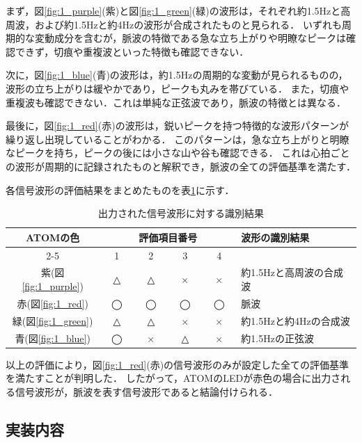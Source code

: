 まず，図\ref{fig:1_purple}(紫)と図\ref{fig:1_green}(緑)の波形は，それぞれ約1.5Hzと高周波，および約1.5Hzと約4Hzの波形が合成されたものと見られる．
いずれも周期的な変動成分を含むが，脈波の特徴である急な立ち上がりや明瞭なピークは確認できず，切痕や重複波といった特徴も確認できない．

次に，図\ref{fig:1_blue}(青)の波形は，約1.5Hzの周期的な変動が見られるものの，波形の立ち上がりは緩やかであり，ピークも丸みを帯びている．
また，切痕や重複波も確認できない．これは単純な正弦波であり，脈波の特徴とは異なる．

最後に，図\ref{fig:1_red}(赤)の波形は，鋭いピークを持つ特徴的な波形パターンが繰り返し出現していることがわかる．
このパターンは，急な立ち上がりと明瞭なピークを持ち，ピークの後には小さな山や谷も確認できる．
これは心拍ごとの波形が周期的に記録されたものと解釈でき，脈波の全ての評価基準を満たす．

各信号波形の評価結果をまとめたものを表\ref{tab:1-2}に示す．
\begin{table}[H]
  \caption{出力された信号波形に対する識別結果}
  \centering
  \begin{tabular}{|c|c|c|c|c|l|}
    \hline
    \multirow{2}{*}{ATOMの色} & \multicolumn{4}{c|}{評価項目番号} & \multirow{2}{*}{波形の識別結果} \\
    \cline{2-5}
     & ~~1~~ & ~~2~~ & ~~3~~ & ~~4~~ & \\
    \hline \hline
    紫(図\ref{fig:1_purple}) & △ & △ & × & × & 約1.5Hzと高周波の合成波 \\
    \hline
    赤(図\ref{fig:1_red}) & ◯ & ◯ & ◯ & ◯ & 脈波 \\
    \hline
    緑(図\ref{fig:1_green}) & △ & △ & × & × & 約1.5Hzと約4Hzの合成波 \\
    \hline
    青(図\ref{fig:1_blue}) & ◯ & × & △ & × & 約1.5Hzの正弦波 \\
    \hline
  \end{tabular}
  \label{tab:1-2}
\end{table}

以上の評価により，図\ref{fig:1_red}(赤)の信号波形のみが設定した全ての評価基準を満たすことが判明した．
したがって，ATOMのLEDが赤色の場合に出力される信号波形が，脈波を表す信号波形であると結論付けられる．


\newpage

\subsection{実装内容}


